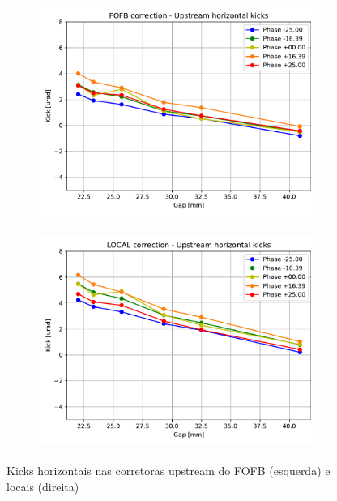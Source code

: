 \documentclass[a4paper,12pt]{article}
\begin{document}
\begin{figure}[H]
\begin{subfigure}{0.5\textwidth}
\includegraphics[width=0.9\linewidth, height=7cm]{figs/FOFB-up-kickx.pdf} 
\label{fig:subimfofbup}
\end{subfigure}
\begin{subfigure}{0.5\textwidth}
\includegraphics[width=0.9\linewidth, height=7cm]{figs/LOCAL-up-kickx.pdf}
\label{fig:subimlocalup}
\end{subfigure}
\caption{Kicks horizontais nas corretoras upstream do FOFB (esquerda) e locais (direita)}
\label{fig:upx}
\end{figure}
\end{document}
